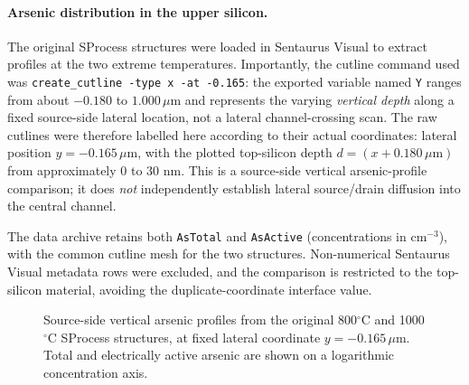 \paragraph{Arsenic distribution in the upper silicon.}
The original SProcess structures were loaded in Sentaurus Visual to
extract profiles at the two extreme temperatures. Importantly, the
cutline command used was \texttt{create\_cutline -type x -at -0.165}:
the exported variable named \texttt{Y} ranges from about
$-0.180$ to $1.000\,\mu$m and represents the varying
\emph{vertical depth} along a fixed source-side lateral location,
not a lateral channel-crossing scan. The raw cutlines were therefore
labelled here according to their actual coordinates:
lateral position $y=-0.165\,\mu$m, with the plotted top-silicon
depth $d=(x+0.180\,\mu\mathrm{m})$ from approximately 0 to 30 nm.
This is a source-side vertical arsenic-profile comparison; it does
\emph{not} independently establish lateral source/drain diffusion
into the central channel.

The data archive
retains both \texttt{AsTotal} and \texttt{AsActive}
(concentrations in cm$^{-3}$), with the common cutline mesh for the
two structures. Non-numerical Sentaurus Visual metadata rows were
excluded, and the comparison is restricted to the top-silicon
material, avoiding the duplicate-coordinate interface value.

\begin{figure}[H]\centering
{}
\caption{Source-side vertical arsenic profiles from the original
800$^\circ$C and 1000$^\circ$C SProcess structures, at fixed lateral
coordinate $y=-0.165\,\mu$m. Total and electrically active arsenic
are shown on a logarithmic concentration axis.}
\label{fig:part3_arsenic_extremes}
\end{figure}

